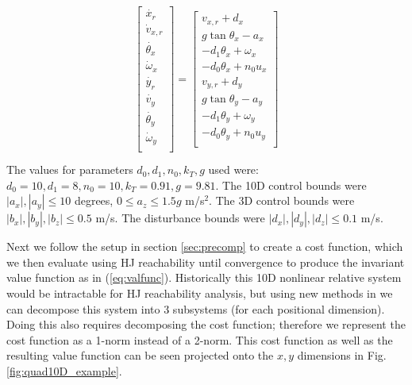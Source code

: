 \begin{equation}
\label{eq:Quad10DRel_dyn}
\begin{aligned}
\begin{array}{c}
\left[
\begin{array}{c}
\dot{x_r}\\
\dot v_{x,r}\\
\dot{\theta_{x}}\\
\dot\omega_{x}\\
\dot{y_r}\\
\dot{v_{y}}\\
\dot{\theta_{y}}\\
\dot\omega_{y}\\
\end{array}
\right]
=
\left[
\begin{array}{c}
v_{x,r} + d_x\\
g \tan \theta_x - a_x\\
-d_1 \theta_x + \omega_x\\
-d_0 \theta_x + n_0 u_x\\
v_{y,r} + d_y\\
g \tan \theta_y - a_y\\
-d_1 \theta_y + \omega_y\\
-d_0 \theta_y + n_0 u_y\\
\end{array}
\right]
\end{array}\\
\end{aligned}
\end{equation}
The values for parameters $d_0,d_1,n_0,k_T,g$ used were: $d_0=10,d_1=8,n_0=10,k_T=0.91,g=9.81$. The 10D control bounds were $|a_x|,|a_y|\leq10$ degrees, $0\leq a_z\leq 1.5g$ m/s$^{2}$. The 3D control bounds were $|b_x|,|b_y|,|b_z|\leq0.5$ m/s. The disturbance bounds were $|d_x|,|d_y|,|d_z|\leq0.1$ m/s. 

Next we follow the setup in section \ref{sec:precomp} to create a cost function, which we then evaluate using HJ reachability until convergence to produce the invariant value function as in (\ref{eq:valfunc}). Historically this 10D nonlinear relative system would be intractable for HJ reachability analysis, but using new methods in \cite{Chen2016DecouplingExact, Chen2016DecouplingJournal} we can decompose this system into 3 subsystems (for each positional dimension). Doing this also requires decomposing the cost function; therefore we represent the cost function as a 1-norm instead of a 2-norm. This cost function as well as the resulting value function can be seen projected onto the $x,y$ dimensions in Fig. \ref{fig:quad10D_example}.

